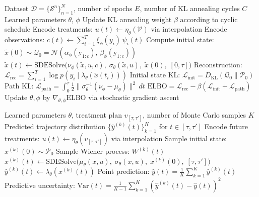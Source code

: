 \documentclass[preprint,12pt]{elsarticle}
\begin{document}
\begin{algorithm}[t]
\caption{Training procedure}
\label{alg:training}
\begin{algorithmic}[1]
\REQUIRE Dataset $\mathcal{D} = \{\mathcal{S}^n\}_{n=1}^{N}$, number of epochs $E$, number of KL annealing cycles $C$
\ENSURE Learned parameters $\theta$, $\phi$
    \STATE Update KL annealing weight $\beta$ according to cyclic schedule
        \STATE Encode treatments: $u(t) \leftarrow \eta_\theta(\mathcal{V})$ via interpolation
        \STATE Encode observations: $c(t) \leftarrow \sum_{i=1}^{T} \xi_\phi(y_i)\,\psi_i(t)$
        \STATE Compute initial state: $\tilde{x}(0) \sim \mathcal{Q}_0 = \mathcal{N}(\alpha_\phi(\mathrm{y}_{1:c}),\, \beta_\phi(\mathrm{y}_{1:c}))$
        \STATE $\tilde{x}(t) \leftarrow \text{SDESolve}\big(\nu_\phi(\tilde{x}, u, c),\; \sigma_\theta(\tilde{x}, u),\; \tilde{x}(0),\; [0, \tau]\big)$
        \STATE Reconstruction: $\mathcal{L}_{\text{rec}} = \sum_{i=1}^{T} \log p(y_i \mid \lambda_\theta(\tilde{x}(t_i)))$
        \STATE Initial state KL: $\mathcal{L}_{\text{init}} = D_{\mathrm{KL}}(\mathcal{Q}_0 \| \mathcal{P}_0)$
        \STATE Path KL: $\mathcal{L}_{\text{path}} = \int_0^\tau \frac{1}{2} \| \sigma_\theta^{-1}(\nu_\phi - \mu_\theta) \|^2 \, dt$
        \STATE $\text{ELBO} = \mathcal{L}_{\text{rec}} - \beta \left( \mathcal{L}_{\text{init}} + \mathcal{L}_{\text{path}} \right)$
        \STATE Update $\theta, \phi$ by $\nabla_{\theta, \phi} \text{ELBO}$ via stochastic gradient ascent
    \ENDFOR
\ENDFOR
\end{algorithmic}
\end{algorithm}

\begin{algorithm}[t]
\caption{Inference and forecasting}
\label{alg:inference}
\begin{algorithmic}[1]
\REQUIRE Learned parameters $\theta$, treatment plan $v_{[\tau, \tau']}$, number of Monte Carlo samples $K$
\ENSURE Predicted trajectory distribution $\{\hat{y}^{(k)}(t)\}_{k=1}^{K}$ for $t \in [\tau, \tau']$
\STATE Encode future treatments: $u(t) \leftarrow \eta_\theta(v_{[\tau, \tau']})$ via interpolation
    \STATE Sample initial state: $x^{(k)}(0) \sim \mathcal{P}_0$
    \STATE Sample Wiener process: $W^{(k)}(t)$
	\STATE $x^{(k)}(t) \leftarrow \text{SDESolve}\big(\mu_\theta(x, u),\; \sigma_\theta(x, u),\; x^{(k)}(0),\; [\tau, \tau']\big)$
    \STATE $\hat{y}^{(k)}(t) \leftarrow \lambda_\theta(x^{(k)}(t))$
\ENDFOR
\STATE Point prediction: $\hat{y}(t) = \frac{1}{K} \sum_{k=1}^{K} \hat{y}^{(k)}(t)$
\STATE Predictive uncertainty: $\text{Var}(t) = \frac{1}{K-1} \sum_{k=1}^{K} (\hat{y}^{(k)}(t) - \hat{y}(t))^2$
\end{algorithmic}
\end{algorithm}
\end{document}

